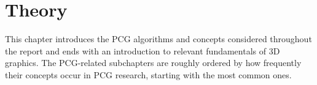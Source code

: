 \chapter{Theory}

This chapter introduces the PCG algorithms and concepts considered throughout the report and ends with an introduction to relevant fundamentals of 3D graphics.
The PCG-related subchapters are roughly ordered by how frequently their concepts occur in PCG research, starting with the most common ones.








